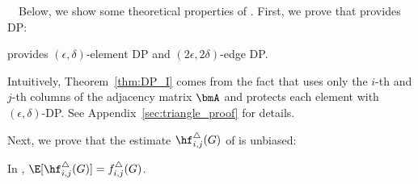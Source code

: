 \smallskip
{}~~Below, we show some theoretical properties of \AlgWS{}. 
First, we prove that \AlgWS{} provides DP: 
\begin{theorem}
\label{thm:DP_I}
\AlgWS{} provides $(\epsilon, \delta)$-element DP and $(2\epsilon, 2\delta)$-edge DP. 
\end{theorem}
Intuitively, Theorem~\ref{thm:DP_I} comes from the fact that \AlgWS{} uses only the $i$-th and $j$-th columns of the adjacency matrix $\bmA$ and protects each element with $(\epsilon,\delta)$-DP. 
See Appendix~\ref{sec:triangle_proof} for details. 

Next, we prove that the estimate $\hf_{i,j}^\triangle(G)$ of \AlgWS{} is unbiased: 
\begin{theorem}
\label{thm:unbiased_I}
In \AlgWS{}, $\E[\hf_{i,j}^\triangle(G)] = f_{i,j}^\triangle(G)$. 
\end{theorem}

